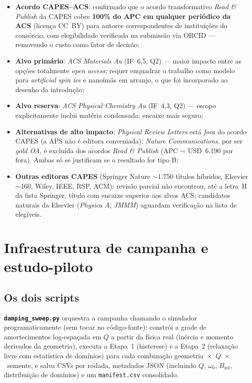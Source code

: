 \documentclass[11pt,a4paper]{article}
\newcommand{\code}[1]{\texttt{#1}}
\begin{document}
\begin{itemize}
\item \textbf{Acordo CAPES--ACS}: confirmado que o acordo transformativo
\emph{Read \& Publish} da CAPES cobre \textbf{100\% do APC em qualquer
periódico da ACS} (licença CC~BY) para autores correspondentes de
instituições do consórcio, com elegibilidade verificada na submissão via
ORCID --- removendo o custo como fator de decisão;
\item \textbf{Alvo primário}: \emph{ACS Materials Au} (IF~6{,}5, Q2) ---
maior impacto entre as opções totalmente \emph{open access}; requer
enquadrar o trabalho como modelo para \emph{artificial spin ice} e
nanoímãs em arranjo, o que foi incorporado ao desenho da introdução;
\item \textbf{Alvo reserva}: \emph{ACS Physical Chemistry Au} (IF~4{,}3,
Q2) --- escopo explicitamente inclui matéria condensada; encaixe mais
seguro;
\item \textbf{Alternativas de alto impacto}: \emph{Physical Review
Letters} está \emph{fora} do acordo CAPES (a APS não é editora
conveniada); \emph{Nature Communications}, por ser \emph{gold OA}, é
excluída dos acordos \emph{Read \& Publish} (APC $\sim$ USD~6.190 por
fora). Ambas só se justificam se o resultado for tipo B;
\item \textbf{Outras editoras CAPES} (Springer Nature $\sim$1.750
títulos híbridos, Elsevier $\sim$160, Wiley, IEEE, RSP, ACM): revisão
parcial não encontrou, até a letra~H da lista Springer, título com
encaixe superior aos alvos ACS; candidatos naturais da Elsevier
(\emph{Physica A}, \emph{JMMM}) aguardam verificação na lista de
elegíveis.
\end{itemize}

\section{Infraestrutura de campanha e estudo-piloto}
\label{sec:campanha}

\subsection{Os dois scripts}

\textbf{\code{damping\_sweep.py}} orquestra a campanha chamando o
simulador programaticamente (sem tocar no código-fonte): constrói a
grade de amortecimentos log-espaçada em $Q$ a partir da física real
(inércia e momento derivados da geometria), executa a Etapa~1
(histerese) e a Etapa~2 (relaxação livre com estatística de domínios)
para cada combinação geometria~$\times$~$Q$~$\times$~semente, e salva
CSVs por rodada, metadados JSON (incluindo $Q$, $\omega_0$,
$B_{\mathrm{ref}}$, distribuição de domínios) e um \code{manifest.csv}
consolidado.
\end{document}
